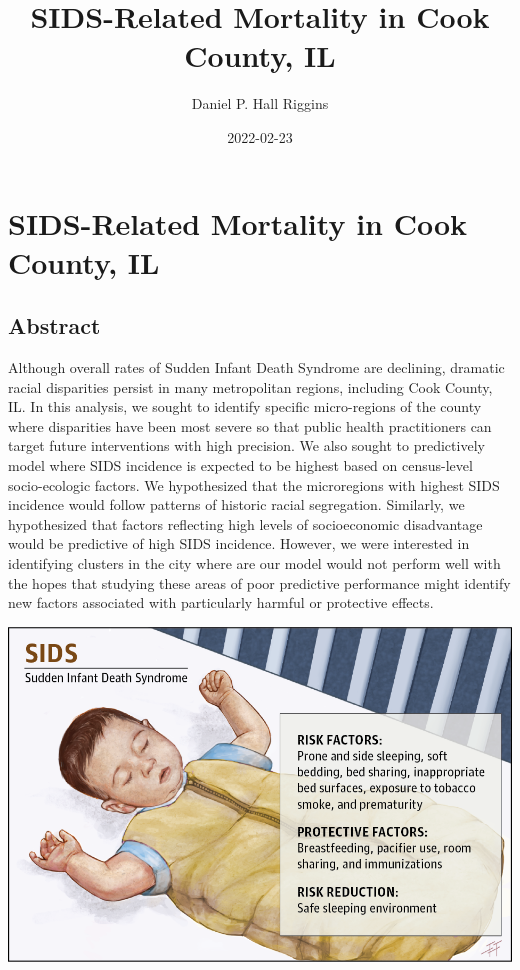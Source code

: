\documentclass[
]{book}
\title{SIDS-Related Mortality in Cook County, IL}
\author{Daniel P. Hall Riggins}
\date{2022-02-23}
\begin{document}
\maketitle

{
\setcounter{tocdepth}{1}
\tableofcontents
}
\hypertarget{sids-related-mortality-in-cook-county-il}{%
\chapter{SIDS-Related Mortality in Cook County, IL}\label{sids-related-mortality-in-cook-county-il}}

\hypertarget{abstract}{%
\section{Abstract}\label{abstract}}

Although overall rates of Sudden Infant Death Syndrome are declining, dramatic racial disparities persist in many metropolitan regions, including Cook County, IL. In this analysis, we sought to identify specific micro-regions of the county where disparities have been most severe so that public health practitioners can target future interventions with high precision. We also sought to predictively model where SIDS incidence is expected to be highest based on census-level socio-ecologic factors. We hypothesized that the microregions with highest SIDS incidence would follow patterns of historic racial segregation. Similarly, we hypothesized that factors reflecting high levels of socioeconomic disadvantage would be predictive of high SIDS incidence. However, we were interested in identifying clusters in the city where are our model would not perform well with the hopes that studying these areas of poor predictive performance might identify new factors associated with particularly harmful or protective effects.

\includegraphics[width=13.14in]{media/safe_sleep}
\end{document}
